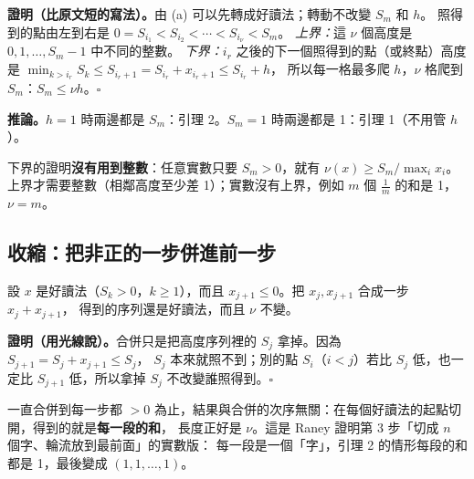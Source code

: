 \textbf{證明（比原文短的寫法）。}由 (a) 可以先轉成好讀法；轉動不改變 $S_m$ 和 $h$。
照得到的點由左到右是 $0=S_{i_1}<S_{i_2}<\cdots<S_{i_\nu}<S_m$。
\emph{上界：}這 $\nu$ 個高度是 $0,1,\ldots,S_m-1$ 中不同的整數。
\emph{下界：}$i_r$ 之後的下一個照得到的點（或終點）高度是 $\min_{k>i_r}S_k\le S_{i_r+1}=S_{i_r}+x_{i_r+1}\le S_{i_r}+h$，
所以每一格最多爬 $h$，$\nu$ 格爬到 $S_m$：$S_m\le\nu h$。\hfill$\square$

\textbf{推論。}$h=1$ 時兩邊都是 $S_m$：引理 2。$S_m=1$ 時兩邊都是 1：引理 1（不用管 $h$）。

\begin{table}[H]
\centering\small
\RanNeyBounds
\caption{上下界的例子。兩邊都可能取到等號，也可能嚴格在中間（$(3,-1,-1,2)$）。}
\label{tab:neybounds}
\end{table}

\begin{notebox}
下界的證明\textbf{沒有用到整數}：任意實數只要 $S_m>0$，就有 $\nu(x)\ge S_m/\max_ix_i$。
上界才需要整數（相鄰高度至少差 1）；實數沒有上界，例如 $m$ 個 $\tfrac1m$ 的和是 1，$\nu=m$。
\end{notebox}

\subsection{收縮：把非正的一步併進前一步}

\begin{thmbox}[性質 6（Neylon）]
設 $x$ 是好讀法（$S_k>0$，$k\ge1$），而且 $x_{j+1}\le0$。把 $x_j,x_{j+1}$ 合成一步 $x_j+x_{j+1}$，
得到的序列還是好讀法，而且 $\nu$ 不變。
\end{thmbox}

\textbf{證明（用光線說）。}合併只是把高度序列裡的 $S_j$ 拿掉。因為 $S_{j+1}=S_j+x_{j+1}\le S_j$，
$S_j$ 本來就照不到；別的點 $S_i$（$i<j$）若比 $S_j$ 低，也一定比 $S_{j+1}$ 低，所以拿掉 $S_j$ 不改變誰照得到。\hfill$\square$

一直合併到每一步都 $>0$ 為止，結果與合併的次序無關：在每個好讀法的起點切開，得到的就是\textbf{每一段的和}，
長度正好是 $\nu$。這是 Raney 證明第 3 步「切成 $n$ 個字、輪流放到最前面」的實數版：
每一段是一個「字」，引理 2 的情形每段的和都是 1，最後變成 $(1,1,\ldots,1)$。

\begin{table}[H]
\centering\small
\RanNeyContract
\caption{$x=(2,-1,1,3,-1,-1)$：直線是好讀法的起點（第 0、2、3 點）。每次合併最左邊可以合併的一步，三步後變成 $(1,1,1)$，$\nu=3$。
原文的例子 $(3,-1,-1,2)\to(2,-1,2)$ 是合併 $x_1,x_2$。}
\label{tab:neycontract}
\end{table}

